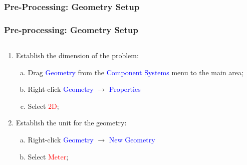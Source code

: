 \documentclass[10pt,compress, unknownkeysallowed]{beamer}
\newcommand{\red}{\textcolor{red}}
\newcommand{\blue}{\textcolor{blue}}
\begin{document}
\subsubsection{Pre-Processing: Geometry Setup}
 
\begin{frame}
 \frametitle{Pre-processing: Geometry Setup} 
    \begin{columns}
       \begin{column}[l]{0.5\linewidth}
          \begin{enumerate}[1)]\scriptsize
             \item<1-> Establish the dimension of the problem:
                 \begin{enumerate}[a)]\scriptsize
                    \item<1-> Drag \blue{Geometry} from the \blue{Component Systems} menu to the main area;
                    \item<1-> Right-click \blue{Geometry} $\rightarrow$ \blue{Properties}
                    \item<1-> Select \red{2D};
                 \end{enumerate}
             \item<2-> Establish the unit for the geometry:
                 \begin{enumerate}[a)]\scriptsize
                    \item<2-> Right-click \blue{Geometry} $\rightarrow$ \blue{New Geometry}
                    \item<2-> Select \red{Meter};
                 \end{enumerate}
          \end{enumerate}
       \end{column}
       \begin{column}[l]{0.5\linewidth}
       \end{column}
    \end{columns}
\end{frame} 
 
\end{document}
